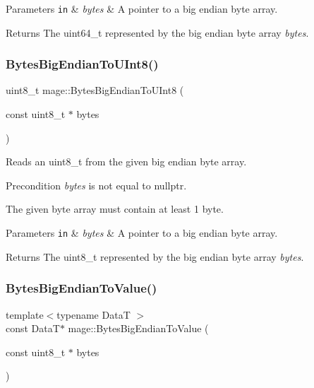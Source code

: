 \begin{DoxyParams}[1]{Parameters}
\mbox{\tt in}  & {\em bytes} & A pointer to a big endian byte array. \\
\hline
\end{DoxyParams}
\begin{DoxyReturn}{Returns}
The {\ttfamily uint64\+\_\+t} represented by the big endian byte array {\itshape bytes}. 
\end{DoxyReturn}
\hypertarget{namespacemage_a89be63c40055cf211d63423bb25be1cc}{}\label{namespacemage_a89be63c40055cf211d63423bb25be1cc} 
\subsubsection{\texorpdfstring{Bytes\+Big\+Endian\+To\+U\+Int8()}{BytesBigEndianToUInt8()}}
{\footnotesize\ttfamily uint8\+\_\+t mage\+::\+Bytes\+Big\+Endian\+To\+U\+Int8 (\begin{DoxyParamCaption}\item[{const uint8\+\_\+t $\ast$}]{bytes }\end{DoxyParamCaption})}

Reads an uint8\+\_\+t from the given big endian byte array.

\begin{DoxyPrecond}{Precondition}
{\itshape bytes} is not equal to {\ttfamily nullptr}. 

The given byte array must contain at least 1 byte. 
\end{DoxyPrecond}

\begin{DoxyParams}[1]{Parameters}
\mbox{\tt in}  & {\em bytes} & A pointer to a big endian byte array. \\
\hline
\end{DoxyParams}
\begin{DoxyReturn}{Returns}
The {\ttfamily uint8\+\_\+t} represented by the big endian byte array {\itshape bytes}. 
\end{DoxyReturn}
\hypertarget{namespacemage_a71ef38ad4287cdd1fdfa843029aef5b7}{}\label{namespacemage_a71ef38ad4287cdd1fdfa843029aef5b7} 
\subsubsection{\texorpdfstring{Bytes\+Big\+Endian\+To\+Value()}{BytesBigEndianToValue()}}
{\footnotesize\ttfamily template$<$typename DataT $>$ \\
const DataT$\ast$ mage\+::\+Bytes\+Big\+Endian\+To\+Value (\begin{DoxyParamCaption}\item[{const uint8\+\_\+t $\ast$}]{bytes }\end{DoxyParamCaption})}

